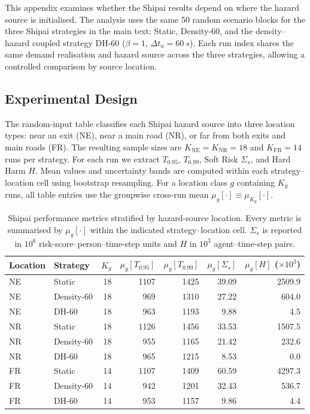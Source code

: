 \documentclass[preprint,12pt]{elsarticle}
\providecommand{\FloatBarrier}{}
\let\origsubsection\subsection
\renewcommand{\subsection}{\FloatBarrier\origsubsection}
\begin{document}
This appendix examines whether the Shipai results depend on where the
hazard source is initialised. The analysis uses the same 50 random scenario
blocks for the three Shipai strategies in the main text: Static, Density-60,
and the density--hazard coupled strategy DH-60
($\beta=1$, $\Delta t_u=\SI{60}{s}$). Each run index shares the same demand
realisation and hazard source across the three strategies, allowing a
controlled comparison by source location.

\subsection{Experimental Design}

The random-input table classifies each Shipai hazard source into three
location types: near an exit (NE), near a main road (NR), or far from both
exits and main roads (FR). The resulting sample sizes are
$K_{\mathrm{NE}}=K_{\mathrm{NR}}=18$ and $K_{\mathrm{FR}}=14$ runs per
strategy. For each run we extract $T_{0.95}$, $T_{0.99}$, Soft Risk
$\Sigma_s$, and Hard Harm $H$. Mean values and uncertainty
bands are computed within each strategy--location cell using bootstrap
resampling. For a location class $g$ containing $K_g$ runs, all table
entries use the groupwise cross-run mean
$\mu_g[\cdot]\equiv\mu_{K_g}[\cdot]$.

\begin{table}[htbp]
\centering
\footnotesize
\setlength{\tabcolsep}{3.5pt}
\renewcommand{\arraystretch}{1.12}
\caption{Shipai performance metrics stratified by hazard-source location.
Every metric is summarised by $\mu_g[\cdot]$ within the indicated
strategy--location cell. $\Sigma_s$ is reported in $10^6$
risk-score--person--time-step units and
$H$ in $10^3$ agent--time-step pairs.}
\label{tab:sm_hazard_location}
\begin{tabular}{llrrrrr}
\toprule
\textbf{Location} & \textbf{Strategy} & \textbf{$K_g$}
  & \textbf{$\mu_g[T_{0.95}]$} & \textbf{$\mu_g[T_{0.99}]$}
  & \textbf{$\mu_g[\Sigma_s]$} & \textbf{$\mu_g[H]$ ($\times10^3$)} \\
\midrule
NE & Static      & 18 & 1107 & 1425 & 39.09 & 2509.9 \\
NE & Density-60 & 18 &  969 & 1310 & 27.22 &  604.0 \\
NE & DH-60       & 18 &  963 & 1193 &  9.88 &    4.5 \\
\midrule
NR & Static      & 18 & 1126 & 1456 & 33.53 & 1507.5 \\
NR & Density-60 & 18 &  955 & 1165 & 21.42 &  232.6 \\
NR & DH-60       & 18 &  965 & 1215 &  8.53 &    0.0 \\
\midrule
FR & Static      & 14 & 1107 & 1409 & 60.59 & 4297.3 \\
FR & Density-60 & 14 &  942 & 1201 & 32.43 &  536.7 \\
FR & DH-60       & 14 &  953 & 1157 &  9.86 &    4.4 \\
\bottomrule
\end{tabular}
\end{table}
\end{document}
